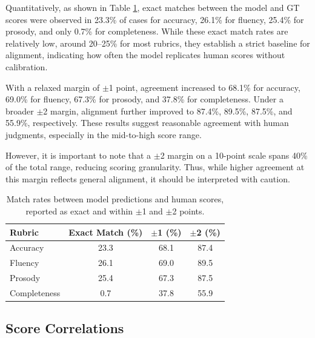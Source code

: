 \documentclass{Interspeech}
\begin{document}
Quantitatively, as shown in Table \ref{tab:score_match}, exact matches between the model and GT scores were observed in 23.3\% of cases for accuracy, 26.1\% for fluency, 25.4\% for prosody, and only 0.7\% for completeness. While these exact match rates are relatively low, around 20–25\% for most rubrics, they establish a strict baseline for alignment, indicating how often the model replicates human scores without calibration. 

With a relaxed margin of $\pm$1 point, agreement increased to 68.1\% for accuracy, 69.0\% for fluency, 67.3\% for prosody, and 37.8\% for completeness. Under a broader $\pm$2 margin, alignment further improved to 87.4\%, 89.5\%, 87.5\%, and 55.9\%, respectively. These results suggest reasonable agreement with human judgments, especially in the mid-to-high score range.

However, it is important to note that a $\pm$2 margin on a 10-point scale spans 40\% of the total range, reducing scoring granularity. Thus, while higher agreement at this margin reflects general alignment, it should be interpreted with caution.

\begin{table}[ht!]
\centering
\small
\caption{Match rates between model predictions and human scores, reported as exact and within $\pm$1 and $\pm$2 points.}
\label{tab:score_match}
\begin{tabular}{lccc}
\toprule
\textbf{Rubric} & \textbf{Exact Match (\%)} & \textbf{$\pm$1 (\%)} & \textbf{$\pm$2 (\%)} \\
\midrule
Accuracy     & 23.3 & 68.1 & 87.4 \\
Fluency      & 26.1 & 69.0 & 89.5 \\
Prosody      & 25.4 & 67.3 & 87.5 \\
Completeness &  0.7 & 37.8 & 55.9 \\
\bottomrule
\end{tabular}
\end{table}



\subsection{Score Correlations}
\label{distribution_agreement}
\end{document}

